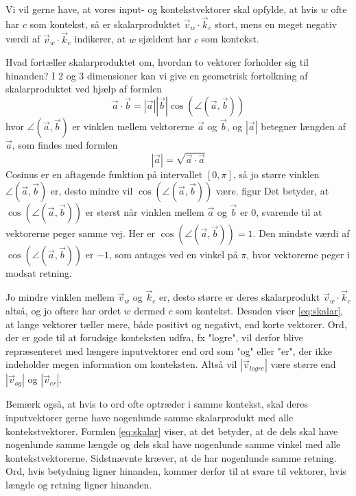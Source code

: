 \documentclass{article}
\newcommand{\am}[1]{{\color{red} #1}}
\begin{document}
Vi vil gerne have, at vores input- og kontekstvektorer skal opfylde, at hvis $w$ ofte har $c$ som kontekst, så er skalarproduktet  $\overrightarrow{v}_{w}\cdot \overrightarrow{k}_{c}$ stort, mens en meget negativ værdi af $\overrightarrow{v}_{w}\cdot \overrightarrow{k}_{c}$ indikerer, at $w$ sjældent har $c$ som kontekst.

Hvad fortæller skalarproduktet om, hvordan to vektorer forholder sig til hinanden? I 2 og 3 dimensioner kan vi give en geometrisk fortolkning af skalarproduktet ved hjælp af formlen 
\begin{equation}\label{eq:skalar}
\overrightarrow{a}\cdot\overrightarrow{b} = |\overrightarrow{a}||\overrightarrow{b}| \cos(\angle (\overrightarrow{a},\overrightarrow{b}))
\end{equation}
hvor $\angle (\overrightarrow{a},\overrightarrow{b})$ er vinklen mellem vektorerne $\overrightarrow{a}$ og $\overrightarrow{b}$, og $|\overrightarrow{a}|$ betegner længden af $\overrightarrow{a}$, som findes med formlen 
$$|\overrightarrow{a}|=\sqrt{\overrightarrow{a}\cdot\overrightarrow{a}}$$
Cosinus er en aftagende funktion på intervallet $[0,\pi]$, så jo større vinklen $\angle (\overrightarrow{a},\overrightarrow{b})$ er, desto mindre vil $\cos(\angle (\overrightarrow{a},\overrightarrow{b}))$ være.\am{figur}
 Det betyder, at $ \cos(\angle (\overrightarrow{a},\overrightarrow{b}))$ er størst når vinklen mellem $\overrightarrow{a}$ og $\overrightarrow{b}$ er 0, svarende til at vektorerne peger samme vej. Her er $ \cos(\angle (\overrightarrow{a},\overrightarrow{b}))=1$. Den mindste værdi af $\cos(\angle (\overrightarrow{a},\overrightarrow{b}))$ er $-1$, som antages ved en vinkel på $\pi$, hvor vektorerne peger i modsat retning. 



Jo mindre vinklen mellem $\overrightarrow{v}_{w}$ og $\overrightarrow{k}_{c}$ er, desto  større er deres skalarprodukt $\overrightarrow{v}_{w}\cdot \overrightarrow{k}_{c}$ altså,  og jo oftere har ordet $w$ dermed $c$  som kontekst. Desuden viser \eqref{eq:skalar}, at lange vektorer tæller mere, både positivt og negativt, end korte vektorer. Ord, der er gode til at forudsige konteksten udfra, fx "logre", vil derfor blive repræsenteret med længere inputvektorer  end ord som "og" eller "er", der ikke indeholder megen information om konteksten.  Altså vil $|\overrightarrow{v}_{logre}|$ være større end $|\overrightarrow{v}_{og}|$ og $|\overrightarrow{v}_{er}|$.

Bemærk også, at hvis to ord  ofte optræder i samme kontekst, skal deres inputvektorer gerne have nogenlunde samme skalarprodukt med alle kontekstvektorer. Formlen \eqref{eq:skalar} viser, at det betyder, at de dels skal have nogenlunde samme længde og dels skal have nogenlunde samme vinkel med alle kontekstvektorerne. Sidstnævnte kræver, at de har nogenlunde samme retning. Ord, hvis betydning ligner hinanden, kommer derfor til at svare til vektorer, hvis længde og retning ligner hinanden.
\end{document}
